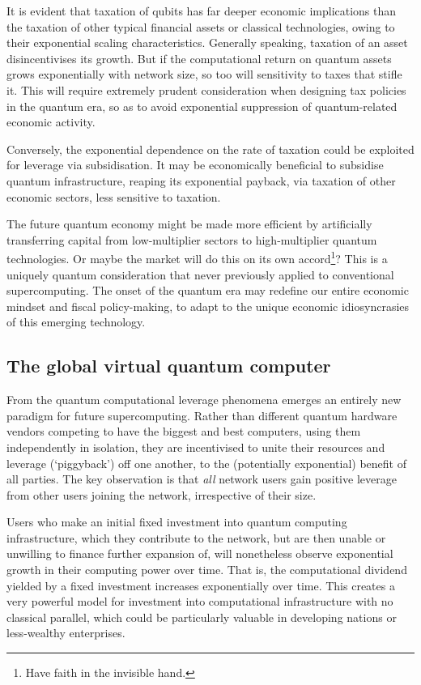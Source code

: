 \documentclass[aps, rmp, twocolumn, amsmath, amssymb, nofootinbib, superscriptaddress, longbibliography, floatfix, table-of-contents, eqsecnum]{revtex4-1}
\begin{document}
It is evident that taxation of qubits has far deeper economic implications than the taxation of other typical financial assets or classical technologies, owing to their exponential scaling characteristics. Generally speaking, taxation of an asset disincentivises its growth. But if the computational return on quantum assets grows exponentially with network size, so too will sensitivity to taxes that stifle it. This will require extremely prudent consideration when designing tax policies in the quantum era, so as to avoid exponential suppression of quantum-related economic activity.

Conversely, the exponential dependence on the rate of taxation could be exploited for leverage via subsidisation. It may be economically beneficial to subsidise quantum infrastructure, reaping its exponential payback, via taxation of other economic sectors, less sensitive to taxation.

The future quantum economy might be made more efficient by artificially transferring capital from low-multiplier sectors to high-multiplier quantum technologies. Or maybe the market will do this on its own accord\footnote{Have faith in the invisible hand.}? This is a uniquely quantum consideration that never previously applied to conventional supercomputing. The onset of the quantum era may redefine our entire economic mindset and fiscal policy-making, to adapt to the unique economic idiosyncrasies of this emerging technology.

%
%

\subsection{The global virtual quantum computer} \label{sec:GVQC} 

From the quantum computational leverage phenomena emerges an entirely new paradigm for future supercomputing. Rather than different quantum hardware vendors competing to have the biggest and best computers, using them independently in isolation, they are incentivised to unite their resources and leverage (`piggyback') off one another, to the (potentially exponential) benefit of all parties. The key observation is that \textit{all} network users gain positive leverage from other users joining the network, irrespective of their size.

Users who make an initial fixed investment into quantum computing infrastructure, which they contribute to the network, but are then unable or unwilling to finance further expansion of, will nonetheless observe exponential growth in their computing power over time. That is, the computational dividend yielded by a fixed investment increases exponentially over time. This creates a very powerful model for investment into computational infrastructure with no classical parallel, which could be particularly valuable in developing nations or less-wealthy enterprises.
\end{document}
